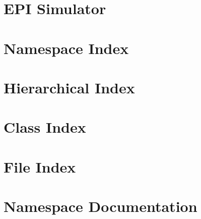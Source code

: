 \let\mypdfximage\pdfximage\def\pdfximage{\immediate\mypdfximage}\documentclass[twoside]{book}
\newcommand{\+}{\discretionary{\mbox{\scriptsize$\hookleftarrow$}}{}{}}
\begin{document}
\chapter{EPI Simulator}
\label{md__r_e_a_d_m_e_old}

\chapter{Namespace Index}

\chapter{Hierarchical Index}

\chapter{Class Index}

\chapter{File Index}

\chapter{Namespace Documentation}


\end{document}
